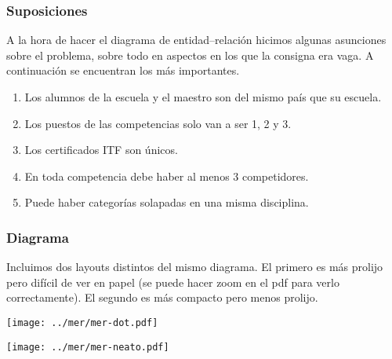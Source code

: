 
\subsubsection{Suposiciones}

A la hora de hacer el diagrama de entidad--relación hicimos algunas asunciones sobre el problema, sobre todo en aspectos en los que la consigna era vaga. A continuación se encuentran los más importantes.

\begin{enumerate}
	\item Los alumnos de la escuela y el maestro son del mismo país que su escuela.
	\item Los puestos de las competencias solo van a ser 1, 2 y 3.
	\item Los certificados ITF son únicos.
	\item En toda competencia debe haber al menos 3 competidores.
	\item Puede haber categorías solapadas en una misma disciplina.
\end{enumerate}

\subsubsection{Diagrama}

Incluimos dos layouts distintos del mismo diagrama. El primero es más prolijo pero difícil de ver en papel (se puede hacer zoom en el pdf para verlo correctamente). El segundo es más compacto pero menos prolijo.

\newpage

\noindent
\texttt{[image: ../mer/mer-dot.pdf]}

\noindent
\texttt{[image: ../mer/mer-neato.pdf]}

